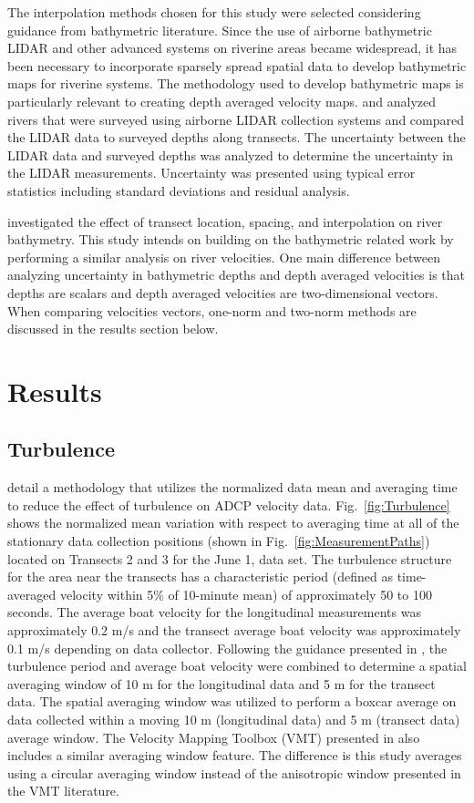 \documentclass[Journal,letterpaper,BackFigs]{ascelike-new}
\begin{document}
The interpolation methods chosen for this study were selected considering guidance from bathymetric literature. Since the use of airborne bathymetric LIDAR and other advanced systems on riverine areas became widespread, it has been necessary to incorporate sparsely spread spatial data to develop bathymetric maps for riverine systems. The methodology used to develop bathymetric maps is particularly relevant to creating depth averaged velocity maps.  and  analyzed rivers that were surveyed using airborne LIDAR collection systems and compared the LIDAR data to surveyed depths along transects. The uncertainty between the LIDAR data and surveyed depths was analyzed to determine the uncertainty in the LIDAR measurements. Uncertainty was presented using typical error statistics including standard deviations and residual analysis. 

 investigated the effect of transect location, spacing, and interpolation on river bathymetry. This study intends on building on the bathymetric related work by performing a similar analysis on river velocities. One main difference between analyzing uncertainty in bathymetric depths and depth averaged velocities is that depths are scalars and depth averaged velocities are two-dimensional vectors. When comparing velocities vectors, one-norm and two-norm methods are discussed in the results section below.

\section{Results}

\subsection{Turbulence}
 detail a methodology that utilizes the normalized data mean and averaging time to reduce the effect of turbulence on ADCP velocity data. Fig.~\ref{fig:Turbulence} shows the normalized mean variation with respect to averaging time at all of the stationary data collection positions (shown in Fig.~\ref{fig:MeasurementPaths}) located on Transects 2 and 3 for the June 1, data set. The turbulence structure for the area near the transects has a characteristic period (defined as time-averaged velocity within 5\% of 10-minute mean) of approximately 50 to 100 seconds. The average boat velocity for the longitudinal measurements was approximately 0.2 m/s and the transect average boat velocity was approximately 0.1 m/s depending on data collector. Following the guidance presented in , the turbulence period and average boat velocity were combined to determine a spatial averaging window of 10 m  for the longitudinal data and 5 m for the transect data. The spatial averaging window was utilized to perform a boxcar average on data collected within a moving 10 m (longitudinal data) and 5 m (transect data) average window. The Velocity Mapping Toolbox (VMT) presented in  also includes a similar averaging window feature. The difference is this study averages using a circular averaging window instead of the anisotropic window presented in the VMT literature. 
\end{document}
